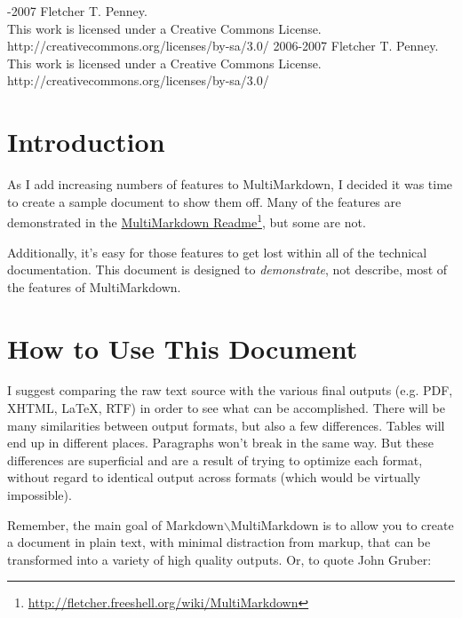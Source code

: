 \documentclass[oneside,article]{memoir}
\title{\mytitle}
\author{\myauthor}
\def\revision{}
\def\mycopyright{2006-2007 Fletcher T. Penney. \\ This work is licensed under a Creative Commons License. \\ http://creativecommons.org/licenses/by-sa/3.0/}
\begin{document}
\mainmatter

\maketitle

\setlength{\parindent}{0pt}

\ifx\mycopyright\undefined
\else
	\textcopyright{} \mycopyright
\fi

\revision

\setlength{\parindent}{1em}

%
%


\setlength{\parindent}{1em}

\chapter{Introduction}
\label{introduction}

As I add increasing numbers of features to MultiMarkdown, I decided it was
time to create a sample document to show them off. Many of the features are
demonstrated in the \href{http://fletcher.freeshell.org/wiki/MultiMarkdown}{MultiMarkdown Readme}\footnote{\href{http://fletcher.freeshell.org/wiki/MultiMarkdown}{http://fletcher.freeshell.org/wiki/MultiMarkdown}}, but some are not.


Additionally, it's easy for those features to get lost within all of the
technical documentation. This document is designed to {\itshape demonstrate}, not
describe, most of the features of MultiMarkdown.


\chapter{How to Use This Document}
\label{howtousethisdocument}

I suggest comparing the raw text source with the various final outputs (e.g.
PDF, XHTML, LaTeX, RTF) in order to see what can be accomplished. There will
be many similarities between output formats, but also a few differences.
Tables will end up in different places. Paragraphs won't break in the same
way. But these differences are superficial and are a result of trying to
optimize each format, without regard to identical output across formats (which
would be virtually impossible).


Remember, the main goal of Markdown$\backslash$MultiMarkdown is to allow you to create a
document in plain text, with minimal distraction from markup, that can be
transformed into a variety of high quality outputs. Or, to quote John Gruber:
\end{document}
